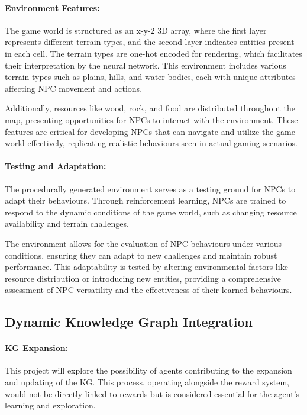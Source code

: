 \documentclass{article}
\begin{document}
\paragraph{Environment Features:}
The game world is structured as an x-y-2 3D array, where the first layer represents different terrain types, and the second layer indicates entities present in each cell. The terrain types are one-hot encoded for rendering, which facilitates their interpretation by the neural network. This environment includes various terrain types such as plains, hills, and water bodies, each with unique attributes affecting NPC movement and actions. 

Additionally, resources like wood, rock, and food are distributed throughout the map, presenting opportunities for NPCs to interact with the environment. These features are critical for developing NPCs that can navigate and utilize the game world effectively, replicating realistic behaviours seen in actual gaming scenarios.

\paragraph{Testing and Adaptation:}
The procedurally generated environment serves as a testing ground for NPCs to adapt their behaviours. Through reinforcement learning, NPCs are trained to respond to the dynamic conditions of the game world, such as changing resource availability and terrain challenges.

The environment allows for the evaluation of NPC behaviours under various conditions, ensuring they can adapt to new challenges and maintain robust performance. This adaptability is tested by altering environmental factors like resource distribution or introducing new entities, providing a comprehensive assessment of NPC versatility and the effectiveness of their learned behaviours.

\subsection{Dynamic Knowledge Graph Integration}
\paragraph{KG Expansion:}
This project will explore the possibility of agents contributing to the expansion and updating of the KG. This process, operating alongside the reward system, would not be directly linked to rewards but is considered essential for the agent's learning and exploration.
\end{document}
